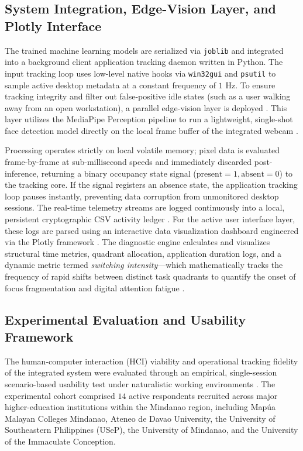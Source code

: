 \documentclass[conference]{IEEEtran}
\begin{document}
\subsection{System Integration, Edge-Vision Layer, and Plotly Interface}
The trained machine learning models are serialized via \texttt{joblib} and integrated into a background client application tracking daemon written in Python. The input tracking loop uses low-level native hooks via \texttt{win32gui} and \texttt{psutil} to sample active desktop metadata at a constant frequency of $1\text{ Hz}$. To ensure tracking integrity and filter out false-positive idle states (such as a user walking away from an open workstation), a parallel edge-vision layer is deployed \cite{414}. This layer utilizes the MediaPipe Perception pipeline to run a lightweight, single-shot face detection model directly on the local frame buffer of the integrated webcam \cite{Lugaresi2019, Bazarevsky2019}.

Processing operates strictly on local volatile memory; pixel data is evaluated frame-by-frame at sub-millisecond speeds and immediately discarded post-inference, returning a binary occupancy state signal ($\text{present} = 1, \text{absent} = 0$) to the tracking core. If the signal registers an absence state, the application tracking loop pauses instantly, preventing data corruption from unmonitored desktop sessions. The real-time telemetry streams are logged continuously into a local, persistent cryptographic CSV activity ledger \cite{Abhari2022}. For the active user interface layer, these logs are parsed using an interactive data visualization dashboard engineered via the Plotly framework \cite{Abhari2022}. The diagnostic engine calculates and visualizes structural time metrics, quadrant allocation, application duration logs, and a dynamic metric termed \emph{switching intensity}—which mathematically tracks the frequency of rapid shifts between distinct task quadrants to quantify the onset of focus fragmentation and digital attention fatigue \cite{Abhari2022, Narechania2021}.

\subsection{Experimental Evaluation and Usability Framework}
The human-computer interaction (HCI) viability and operational tracking fidelity of the integrated system were evaluated through an empirical, single-session scenario-based usability test under naturalistic working environments \cite{Sauro2016}. The experimental cohort comprised $14$ active respondents recruited across major higher-education institutions within the Mindanao region, including Mapúa Malayan Colleges Mindanao, Ateneo de Davao University, the University of Southeastern Philippines (USeP), the University of Mindanao, and the University of the Immaculate Conception. 
\end{document}

